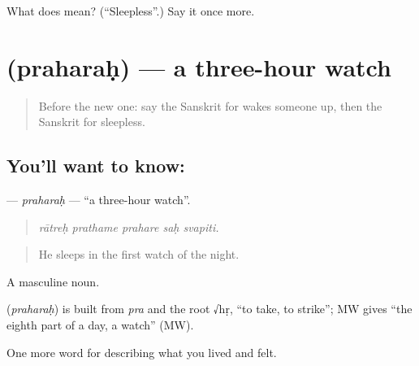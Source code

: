\begin{tcolorbox}[breakable,colback=teal!4,colframe=teal!35!black,title={Before you move on}]
What does  mean? (\textquotedblleft{}Sleepless\textquotedblright{}.) Say it once more.
\end{tcolorbox}
\section[\texorpdfstring{\sk{प्रहरः} (praharaḥ)}{प्रहरः (praharaḥ)}]{ (praharaḥ) — a three-hour watch}

\label{lesson:SA-C488-praharah}



\begin{quote}
Before the new one: say the Sanskrit for wakes someone up, then the Sanskrit for sleepless.
\end{quote}

\subsection*{You'll want to know: }
\textbf{} — \emph{praharaḥ} — \textquotedblleft{}a three-hour watch\textquotedblright{}.

\begin{quote}
    
\end{quote}

\begin{quote}
\emph{rātreḥ prathame prahare saḥ svapiti.}
\end{quote}

\begin{quote}
He sleeps in the first watch of the night.
\end{quote}

A masculine noun.

\begin{cousinweb}
\textbf{} (\emph{praharaḥ}) is built from \emph{pra} and the root √hṛ, \textquotedblleft{}to take, to strike\textquotedblright{}; MW gives \textquotedblleft{}the eighth part of a day, a watch\textquotedblright{} (MW).
\end{cousinweb}

\begin{grammarlens}[title={What you've built}]
One more word for describing what you lived and felt.
\end{grammarlens}

